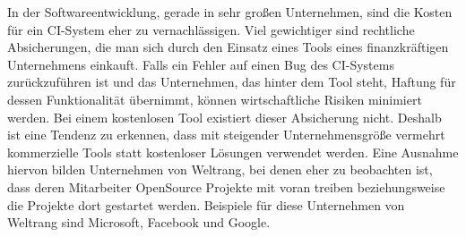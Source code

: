 \begin{itemize}
	In der Softwareentwicklung, gerade in sehr großen Unternehmen, sind die Kosten für ein CI-System eher zu vernachlässigen. Viel gewichtiger sind rechtliche Absicherungen, die man sich durch den Einsatz eines Tools eines finanzkräftigen Unternehmens einkauft. Falls ein Fehler auf einen Bug des CI-Systems zurückzuführen ist und das Unternehmen, das hinter dem Tool steht, Haftung für dessen Funktionalität übernimmt, können wirtschaftliche Risiken minimiert werden. Bei einem kostenlosen Tool existiert dieser Absicherung nicht. Deshalb ist eine Tendenz zu erkennen, dass mit steigender Unternehmensgröße vermehrt kommerzielle Tools statt kostenloser Lösungen verwendet werden. Eine Ausnahme hiervon bilden Unternehmen von Weltrang, bei denen eher zu beobachten ist, dass deren Mitarbeiter OpenSource Projekte mit voran treiben beziehungsweise die Projekte dort gestartet werden. Beispiele für diese Unternehmen von Weltrang sind Microsoft, Facebook und Google.
	\end{itemize}
